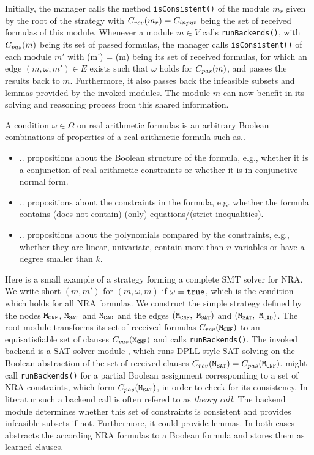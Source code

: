 Initially, the manager calls the method
\texttt{isConsistent()} of the module $m_r$ given by the root of
the strategy with $C_{rcv}(m_r) = C_{input}$ being the set of received formulas of this
module. Whenever a module $m\in V$ calls
\texttt{runBackends()}, with $C_{pas}(m)$ being its set of passed
formulas, the manager calls \texttt{isConsistent()} of each module
$m'$ with \Crcv(m') = \Cpass(m) being its set of received formulas, for which
an edge $(m, \omega, m')\in E$ exists such that $\omega$ holds for
$C_{pas}(m)$, and passes the results back to $m$. Furthermore, it also
passes back the infeasible subsets and lemmas provided by the invoked
modules. The module $m$ can now benefit in its solving and reasoning
process from this shared information. 

A condition  $\omega\in\Omega$ on real arithmetic formulas is an
arbitrary Boolean combinations of properties of a real arithmetic formula such as..
\begin{itemize}
	\item .. propositions about the Boolean structure of the formula, e.g., whether it is a conjunction of
		real arithmetic constraints or whether it is in conjunctive normal form.
	\item .. propositions about the constraints in the formula, e.g. whether the formula contains (does not contain)
		(only) equations/(strict inequalities).
	\item .. propositions about the polynomials compared by the constraints, e.g., whether they are 
		linear, univariate, contain more than $n$ variables or have a degree smaller than $k$.
\end{itemize}

Here is a small example of a strategy forming a complete SMT solver for NRA. 
We write short $(m, m')$ for $(m, \omega, m)$ if $\omega = \texttt{true}$, which
is the condition which holds for all NRA formulas. We construct the simple 
strategy defined by the nodes $\texttt{M$_\text{CNF}$}$, $\texttt{M$_\text{SAT}$}$ and $\texttt{M$_\text{CAD}$}$ 
and the edges $(\texttt{M$_\text{CNF}$},\ \texttt{M$_\text{SAT}$})$ and $(\texttt{M$_\text{SAT}$},\ \texttt{M$_\text{CAD}$})$.
The root module \CNFM transforms its set of received formulas $C_{rcv}(\texttt{M$_\text{CNF}$})$ 
to an equisatisfiable set of clauses $C_{pas}(\texttt{M$_\text{CNF}$})$ and calls 
\texttt{runBackends()}. The invoked backend is a SAT-solver module \SATM, which 
runs DPLL-style SAT-solving on the Boolean abstraction of the set of received 
clauses $C_{rcv}(\texttt{M$_\text{SAT}$})=C_{pas}(\texttt{M$_\text{CNF}$})$. \SATM might call 
\texttt{runBackends()} for a partial Boolean assignment corresponding to 
a set of NRA constraints, which form $C_{pas}(\texttt{M$_\text{SAT}$})$, in order to check for 
its consistency. In literatur such a backend call is often refered to as \emph{theory call}.
The backend module \CADM determines whether this set of constraints is consistent and 
provides infeasible subsets if not. Furthermore, it could provide lemmas. In both
cases \SATM abstracts the according NRA formulas to a Boolean formula and stores them
as learned clauses. 

